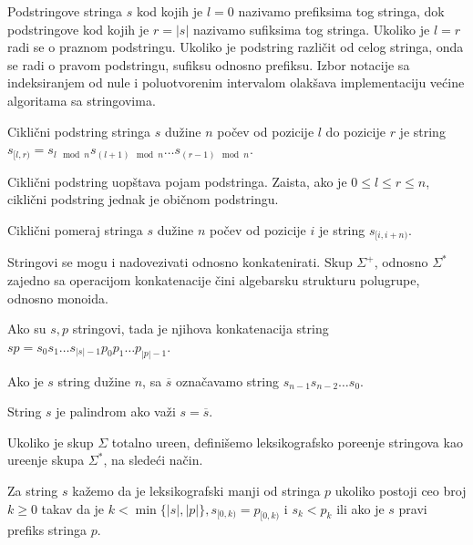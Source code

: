 Podstringove stringa $s$ kod kojih je $l=0$ nazivamo prefiksima tog stringa, dok podstringove kod kojih je $r=|s|$ nazivamo sufiksima tog stringa. Ukoliko je $l=r$ radi se o praznom podstringu. Ukoliko je podstring razli\v cit od celog stringa, onda se radi o pravom podstringu, sufiksu odnosno prefiksu. Izbor notacije sa indeksiranjem od nule i poluotvorenim intervalom olak\v sava implementaciju ve\' cine algoritama sa stringovima.

\begin{dfn}
Cikli\v cni podstring stringa $s$ du\v zine $n$ po\v cev od pozicije $l$ do pozicije $r$ je string $s_{[l, r)} = s_{l \mod n}s_{(l+1)\mod n}\ldots s_{(r-1)\mod n}$.
\end{dfn}

Cikli\v cni podstring uop\v stava pojam podstringa. Zaista, ako je $0 \leq l \leq r \leq n$, cikli\v cni podstring jednak je obi\v cnom podstringu.

\begin{dfn}
Cikli\v cni pomeraj stringa $s$ du\v zine $n$ po\v cev od pozicije $i$ je string $s_{[i, i+n)}$.
\end{dfn}

Stringovi se mogu i nadovezivati odnosno konkatenirati. Skup $\Sigma^+$, odnosno $\Sigma^*$ zajedno sa operacijom konkatenacije \v cini algebarsku strukturu polugrupe, odnosno monoida.

\begin{dfn}
Ako su $s,p$ stringovi, tada je njihova konkatenacija string $sp = s_0s_1\ldots s_{|s|-1}p_0p_1\ldots p_{|p|-1}$.
\end{dfn}

\begin{dfn}
Ako je $s$ string du\v zine $n$, sa $\overline{s}$ ozna\v cavamo string $s_{n-1}s_{n-2}\ldots s_0$.
\end{dfn}

\begin{dfn}
String $s$ je palindrom ako va\v zi $s = \overline{s}$.
\end{dfn}

Ukoliko je skup $\Sigma$ totalno ure\dj en, defini\v semo leksikografsko pore\dj enje stringova kao ure\dj enje skupa $\Sigma^*$, na slede\' ci na\v cin.

\begin{dfn}
Za string $s$ ka\v zemo da je leksikografski manji od stringa $p$ ukoliko postoji ceo broj $k \geq 0$ takav da je $k < \min \{|s|, |p|\}, s_{[0, k)} = p_{[0, k)}$ i $s_k < p_k$ ili ako je $s$ pravi prefiks stringa $p$.
\end{dfn}

